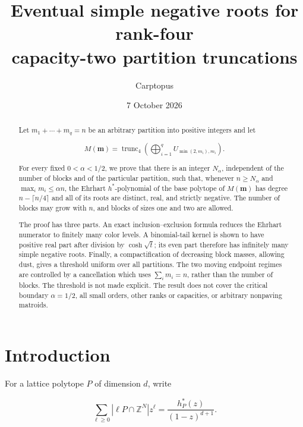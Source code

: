 \documentclass[11pt]{article}
\title{Eventual simple negative roots for rank-four\\capacity-two partition truncations}
\author{Carptopus}
\date{7 October 2026}
\begin{document}
\maketitle

\begin{center}
\end{center}

\begin{abstract}


Let $m_1+\cdots+m_q=n$ be an arbitrary partition into positive integers and let

\[
M(\mathbf m)=\operatorname{trunc}_4\!\left(
  \bigoplus_{i=1}^q U_{\min(2,m_i),m_i}
\right).
\]

For every fixed $0<\alpha<1/2$, we prove that there is an integer
$N_\alpha$, independent of the number of blocks and of the particular partition,
such that, whenever $n\ge N_\alpha$ and $\max_i m_i\le\alpha n$, the Ehrhart
$h^*$-polynomial of the base polytope of $M(\mathbf m)$ has degree
$n-\lceil n/4\rceil$ and all of its roots are distinct, real, and strictly
negative.  The number of blocks may grow with $n$, and blocks of sizes one and
two are allowed.

The proof has three parts.  An exact inclusion--exclusion formula reduces the
Ehrhart numerator to finitely many color levels.  A binomial-tail kernel is shown
to have positive real part after division by $\cosh\sqrt t$; its even part
therefore has infinitely many simple negative roots.  Finally, a compactification
of decreasing block masses, allowing dust, gives a threshold uniform over all
partitions.  The two moving endpoint regimes are controlled by a cancellation
which uses $\sum_i m_i=n$, rather than the number of blocks.  The threshold is
not made explicit.  The result does not cover the critical boundary
$\alpha=1/2$, all small orders, other ranks or capacities, or arbitrary
nonpaving matroids.

\end{abstract}

\section{Introduction}


For a lattice polytope $P$ of dimension $d$, write

\[
  \sum_{\ell\ge0}|\ell P\cap\mathbb Z^N|z^\ell
  =\frac{h_P^*(z)}{(1-z)^{d+1}}.
\]
\end{document}
